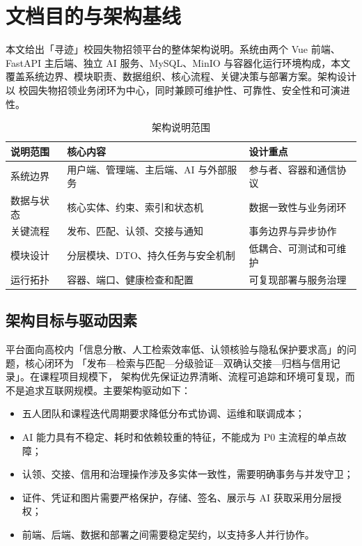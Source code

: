 \section{文档目的与架构基线}

本文给出「寻迹」校园失物招领平台的整体架构说明。系统由两个 Vue 前端、
FastAPI 主后端、独立 AI 服务、MySQL、MinIO 与容器化运行环境构成，本文
覆盖系统边界、模块职责、数据组织、核心流程、关键决策与部署方案。架构设计以
校园失物招领业务闭环为中心，同时兼顾可维护性、可靠性、安全性和可演进性。

\begin{table}[H]
  \centering
  \caption{架构说明范围}
  \begin{tabularx}{\textwidth}{L{3.0cm}Y Y}
    \toprule
    说明范围 & 核心内容 & 设计重点 \\
    \midrule
    系统边界 & 用户端、管理端、主后端、AI 与外部服务 & 参与者、容器和通信协议 \\
    数据与状态 & 核心实体、约束、索引和状态机 & 数据一致性与业务闭环 \\
    关键流程 & 发布、匹配、认领、交接与通知 & 事务边界与异步协作 \\
    模块设计 & 分层模块、DTO、持久任务与安全机制 & 低耦合、可测试和可维护 \\
    运行拓扑 & 容器、端口、健康检查和配置 & 可复现部署与服务治理 \\
    \bottomrule
  \end{tabularx}
\end{table}

\subsection{架构目标与驱动因素}

平台面向高校内「信息分散、人工检索效率低、认领核验与隐私保护要求高」的问题，核心闭环为
「发布---检索与匹配---分级验证---双确认交接---归档与信用记录」。在课程项目规模下，
架构优先保证边界清晰、流程可追踪和环境可复现，而不是追求互联网规模。主要架构驱动如下：

\begin{itemize}
  \item 五人团队和课程迭代周期要求降低分布式协调、运维和联调成本；
  \item AI 能力具有不稳定、耗时和依赖较重的特征，不能成为 P0 主流程的单点故障；
  \item 认领、交接、信用和治理操作涉及多实体一致性，需要明确事务与并发守卫；
  \item 证件、凭证和图片需要严格保护，存储、签名、展示与 AI 获取采用分层授权；
  \item 前端、后端、数据和部署之间需要稳定契约，以支持多人并行协作。
\end{itemize}

